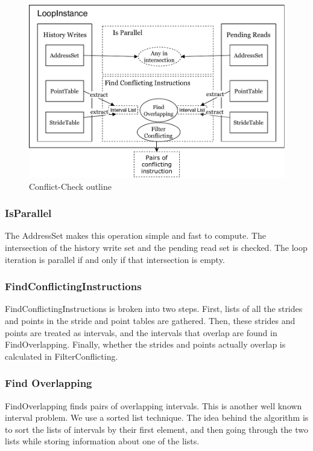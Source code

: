 \documentclass[12pt,twoside]{reedthesis}
\begin{document}
			\begin{figure}
				\caption{Conflict-Check outline}
				\label{fig:conflict-check}
				\includegraphics[scale=1.0]{conflict-diagram-output.pdf}
			\end{figure}
		
		\subsubsection{IsParallel}
		
			The AddressSet makes this operation simple and fast to compute. The intersection of the history write set and the pending read set is checked. The loop iteration is parallel if and only if that intersection is empty. 
			
		\subsubsection{FindConflictingInstructions}
		
			FindConflictingInstructions is broken into two steps. First, lists of all the strides and points in the stride and point tables are gathered. Then, these strides and points are treated as intervals, and the intervals that overlap are found in FindOverlapping. Finally, whether the strides and points actually overlap is calculated in FilterConflicting.
			
		\subsubsection{Find Overlapping}
		
			FindOverlapping finds pairs of overlapping intervals. This is another well known interval problem. We use a sorted list technique. 
			The idea behind the algorithm is to sort the lists of intervals by their first element, and then going through the two lists while storing information about one of the lists. 
			
\end{document}
